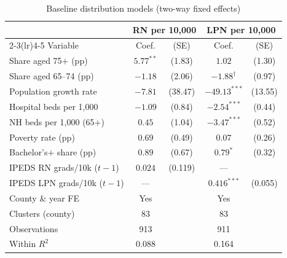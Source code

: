\begin{table}[!htbp]
\centering
\caption{Baseline distribution models (two-way fixed effects)}
\label{tab:baseline}
\small
\begin{tabular}{lcccc}
\toprule
 & \multicolumn{2}{c}{RN per 10{,}000} & \multicolumn{2}{c}{LPN per 10{,}000} \\
\cmidrule(lr){2-3}\cmidrule(lr){4-5}
Variable & Coef. & (SE) & Coef. & (SE) \\
\midrule
Share aged 75$+$ (pp) & $5.77^{**}$ & (1.83) & $1.02$ & (1.30) \\
Share aged 65--74 (pp) & $-1.18$ & (2.06) & $-1.88^{\dagger}$ & (0.97) \\
Population growth rate & $-7.81$ & (38.47) & $-49.13^{***}$ & (13.55) \\
Hospital beds per 1{,}000 & $-1.09$ & (0.84) & $-2.54^{***}$ & (0.44) \\
NH beds per 1{,}000 (65$+$) & $0.45$ & (1.04) & $-3.47^{***}$ & (0.52) \\
Poverty rate (pp) & $0.69$ & (0.49) & $0.07$ & (0.26) \\
Bachelor's$+$ share (pp) & $0.89$ & (0.67) & $0.79^{*}$ & (0.32) \\
IPEDS RN grads/10k ($t-1$) & $0.024$ & (0.119) & --- &  \\
IPEDS LPN grads/10k ($t-1$) & --- &  & $0.416^{***}$ & (0.055) \\
\midrule
County \& year FE & Yes & & Yes & \\
Clusters (county) & 83 & & 83 & \\
Observations & 913 & & 911 & \\
Within $R^{2}$ & 0.088 & & 0.164 & \\
\bottomrule
\end{tabular}
\end{table}

